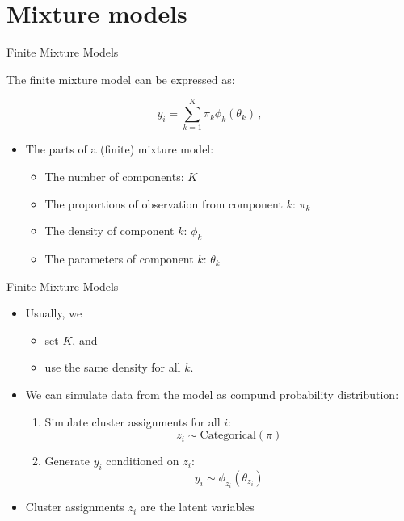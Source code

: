 \documentclass[10pt]{beamer}
\begin{document}
\section{Mixture models}
\frame{\sectionpage}

\begin{frame}{Finite Mixture Models}

The {\color{uured} finite mixture model} can be expressed as:

\[
y_i = \sum_{k=1}^K \pi_k \phi_k(\theta_k)\,,
\]

\begin{itemize}
\item The parts of a (finite) mixture model:
\begin{itemize}
\item The number of components: $K$\pause
\item The proportions of observation from component $k$: $\pi_k$\pause
\item The density of component $k$: $\phi_k$\pause
\item The parameters of component $k$: $\theta_k$
\end{itemize}
\end{itemize}

\end{frame}


\begin{frame}{Finite Mixture Models}

\begin{itemize}
\item Usually, we
\begin{itemize}
\item set $K$, and
\item use the same density for all $k$.
\end{itemize}
\pause
\item We can simulate data from the model as {\color{uured} compund probability distribution}:
\begin{enumerate}
\item Simulate cluster assignments for all $i$:
\[
z_i \sim \text{Categorical}(\pi)
\]
\pause
\item Generate $y_i$ conditioned on $z_i$:
\[
y_i \sim \phi_{z_i}(\theta_{z_i})
\]
\end{enumerate}
\pause
\item Cluster assignments $z_i$ are the {\color{uured} latent variables}
\end{itemize}

\end{frame}
\end{document}
